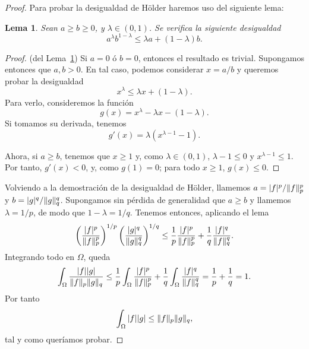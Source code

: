 \documentclass[12pt,a4paper]{book}
\DeclarePairedDelimiter\norm{\lVert}{\rVert}
\newtheorem{lema}{Lema}
\theoremstyle{definition} \newtheorem{defn}[thm]{Definición}
\theoremstyle{definition} \newtheorem{ejemplo}[thm]{Ejemplo}
\theoremstyle{definition} \newtheorem{ejercicio}[thm]{Ejercicio}
\theoremstyle{remark} \newtheorem*{obs}{Observación}
\begin{document}
\begin{proof}
  Para probar la desigualdad de Hölder haremos uso del siguiente lema:
  \begin{lema}\label{desigualdad}
    Sean $a\geq b \geq 0$, y $\lambda \in (0,1)$. Se verifica la siguiente desigualdad
    \begin{equation*}
      a^\lambda b^{1-\lambda} \leq \lambda a + (1-\lambda) b.
    \end{equation*}
  \end{lema}

  \begin{proof}(del Lema~\ref{desigualdad})
    Si $a=0$ ó $b=0$, entonces el resultado es trivial. Supongamos entonces que $a,b > 0$. En tal caso, podemos considerar $x=a/b$ y queremos probar la desigualdad
    \begin{equation*}
      x^{\lambda} \leq \lambda x + (1-\lambda).
    \end{equation*}
    Para verlo, consideremos la función 
    \begin{equation*}
      g(x)=x^{\lambda}-\lambda x - (1-\lambda).
    \end{equation*}
    Si tomamos su derivada, tenemos
    \begin{equation*}
      g'(x)=\lambda (x^{\lambda -1}-1).
    \end{equation*}

    Ahora, si $a \geq b$, tenemos que $x\geq 1$ y, como $\lambda\in (0,1)$, $\lambda -1 \leq 0$ y $x^{\lambda -1}\leq 1$. Por tanto, $g'(x)<0$, y, como $g(1)=0$; para todo $x\geq 1$, $g(x)\leq 0$.
  \end{proof}

  Volviendo a la demostración de la desigualdad de Hölder, llamemos $a=|f|^p/\norm{f}_p^p$ y $b=|g|^q/\norm{g}_q^q$. Supongamos sin pérdida de generalidad que $a \geq b$ y llamemos $\lambda = 1/p$, de modo que $1-\lambda=1/q$. Tenemos entonces, aplicando el lema
  \begin{equation*}
    \left( \frac{|f|^p}{\norm{f}_p^p} \right)^{1/p} \left( \frac{|g|^q}{\norm{g}^q_q} \right)^{1/q}\leq\frac{1}{p}\frac{|f|^p}{\norm{f}_p^p}+\frac{1}{q}\frac{|f|^q}{\norm{f}_q^q}.
  \end{equation*}
  Integrando todo en $\Omega$, queda
  \begin{equation*}
    \int_{\Omega}\frac{|f||g|}{\norm{f}_p \norm{g}_q}\leq\frac{1}{p}\int_\Omega \frac{|f|^p}{\norm{f}_p^p}+\frac{1}{q}\int_\Omega \frac{|f|^q}{\norm{f}_q^q}=\frac{1}{p}+\frac{1}{q}=1.
  \end{equation*}
  Por tanto
  \begin{equation*}
    \int_\Omega |f||g| \leq \norm{f}_p \norm{g}_q,
  \end{equation*}
  tal y como queríamos probar.
\end{proof}
\end{document}
